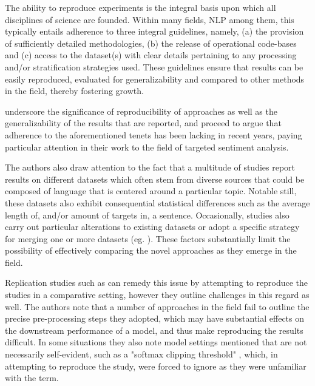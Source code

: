 \documentclass[../../fyp.tex]{subfiles}
\begin{document}
The ability to reproduce experiments is the integral basis upon which all disciplines of science are founded. Within many fields, NLP among them, this typically entails adherence to three integral guidelines, namely, (a) the provision of sufficiently detailed methodologies, (b) the release of operational code-bases and (c) access to the dataset(s) with clear details pertaining to any processing and/or stratification strategies used. These guidelines ensure that results can be easily reproduced, evaluated for generalizability and compared to other methods in the field, thereby fostering growth.

\citet{moore2018} underscore the significance of reproducibility of approaches as well as the generalizability of the results that are reported, and proceed to argue that adherence to the aforementioned tenets has been lacking in recent years, paying particular attention in their work to the field of targeted sentiment analysis.

The authors also draw attention to the fact that a multitude of studies report results on different datasets which often stem from diverse sources that could be composed of language that is centered around a particular topic. Notable still, these datasets also exhibit consequential statistical differences such as the average length of, and/or amount of targets in, a sentence. Occasionally, studies also carry out particular alterations to existing datasets or adopt a specific strategy for merging one or more datasets (eg. \citep{xue2018}). These factors substantially limit the possibility of effectively comparing the novel approaches as they emerge in the field.

Replication studies such as \citep{moore2018} can remedy this issue by attempting to reproduce the studies in a comparative setting, however they outline challenges in this regard as well. The authors note that a number of approaches in the field fail to outline the precise pre-processing steps they adopted, which may have substantial effects on the downstream performance of a model, and thus make reproducing the results difficult. In some situations they also note model settings mentioned that are not necessarily self-evident, such as a "softmax clipping threshold" \citep{tang2016b}, which, in attempting to reproduce the study, \citet{moore2018} were forced to ignore as they were unfamiliar with the term.
\end{document}
